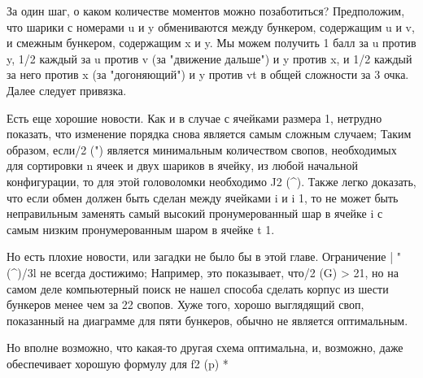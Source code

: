 За один шаг, о каком количестве моментов можно позаботиться?
Предположим, что шарики с номерами u и y обмениваются между бункером, содержащим u и v, и смежным бункером, содержащим x и y.
Мы можем получить 1 балл за u против y, 1/2 каждый за u против v (за "движение дальше") и y против x, и 1/2 каждый за него против x (за "догоняющий") и y против vt в общей сложности за 3 очка.
Далее следует привязка.

Есть еще хорошие новости. Как и в случае с ячейками размера 1, нетрудно показать, что изменение порядка снова является самым сложным случаем; Таким образом, если/2 (") является минимальным количеством свопов, необходимых для сортировки n ячеек и двух шариков в ячейку, из любой начальной конфигурации, то для этой головоломки необходимо J2 (^).
Также легко доказать, что если обмен должен быть сделан между ячейками i и i 1, то не может быть неправильным заменять самый высокий пронумерованный шар в ячейке i с самым низким пронумерованным шаром в ячейке t 1.

Но есть плохие новости, или загадки не было бы в этой главе. Ограничение | "(^)/3l не всегда достижимо; Например, это показывает, что/2 (G) > 21, но на самом деле компьютерный поиск не нашел способа сделать корпус из шести бункеров менее чем за 22 свопов. Хуже того, хорошо выглядящий своп, показанный на диаграмме для пяти бункеров, обычно не является оптимальным.

Но вполне возможно, что какая-то другая схема оптимальна, и, возможно, даже обеспечивает хорошую формулу для f2 (p) *
